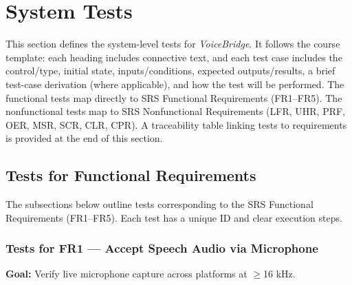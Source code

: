 \documentclass[12pt, titlepage]{article}
\begin{document}
\section{System Tests}

This section defines the system-level tests for \emph{VoiceBridge}. It follows the course template: each heading includes connective text, and each test case includes the control/type, initial state, inputs/conditions, expected outputs/results, a brief test-case derivation (where applicable), and how the test will be performed. The functional tests map directly to SRS Functional Requirements (FR1–FR5). The nonfunctional tests map to SRS Nonfunctional Requirements (LFR, UHR, PRF, OER, MSR, SCR, CLR, CPR). A traceability table linking tests to requirements is provided at the end of this section.

\subsection{Tests for Functional Requirements}

The subsections below outline tests corresponding to the SRS Functional Requirements (FR1--FR5).
Each test has a unique ID and clear execution steps.

\subsubsection{Tests for FR1 — Accept Speech Audio via Microphone}

\textbf{Goal:} Verify live microphone capture across platforms at $\geq$16 kHz.
\end{document}

